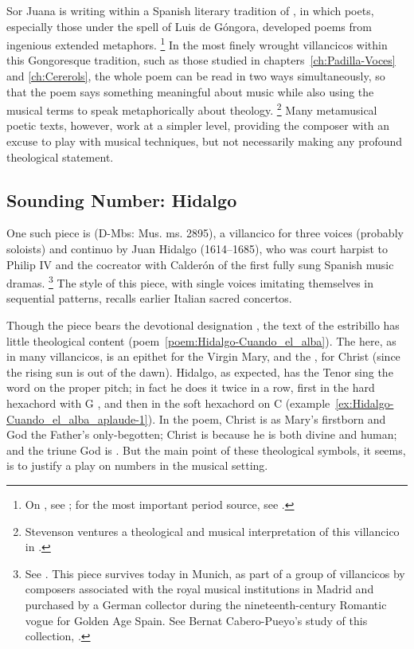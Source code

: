 Sor Juana is writing within a Spanish literary tradition of , in which poets, especially those under the spell of Luis de Góngora, developed poems from ingenious extended metaphors.%
	\footnote{%
	On , see \autocites{Tenorio:Gongorismo}[227--228]{Gaylord:Poetry}; for the most important period source, see \autocite{Gracian:Ingenio}. 
	}
In the most finely wrought villancicos within this Gongoresque tradition, such as those studied in chapters~\ref{ch:Padilla-Voces} and \ref{ch:Cererols}, the whole poem can be read in two ways simultaneously, so that the poem says something meaningful about music while also using the musical terms to speak metaphorically about theology.%
	\footnote{%
	Stevenson ventures a theological and musical interpretation of this villancico in .
	}
Many metamusical poetic texts, however, work at a simpler level, providing the composer with an excuse to play with musical techniques, but not necessarily making any profound theological statement.

\subsection{Sounding Number: Hidalgo}

One such piece is  (D-Mbs: Mus. ms. 2895), a villancico for three voices (probably soloists) and continuo by Juan Hidalgo (1614--1685), who was court harpist to Philip IV and the cocreator with Calderón of the first fully sung Spanish music dramas.%
	\footnote{%
See \autocite{Stein:Songs}.
This piece survives today in Munich, as part of a group of villancicos by composers associated with the royal musical institutions in Madrid and purchased by a German collector during the nineteenth-century Romantic vogue for Golden Age Spain.
See Bernat Cabero-Pueyo's study of this collection, .
	}
The style of this piece, with single voices imitating themselves in sequential patterns, recalls earlier Italian sacred concertos.

Though the piece bears the devotional designation  , the text of the estribillo has little theological content (poem~\ref{poem:Hidalgo-Cuando_el_alba}).
The  here, as in many villancicos, is an epithet for the Virgin Mary, and the , for Christ (since the rising sun is  out of the dawn).
Hidalgo, as expected, has the Tenor sing the word  on the proper pitch; in fact he does it twice in a row, first in the hard hexachord with G , and then in the soft hexachord on C  (example~\ref{ex:Hidalgo-Cuando_el_alba_aplaude-1}).
In the poem, Christ is  as Mary's firstborn and God the Father's only-begotten; Christ is  because he is both divine and human; and the triune God is .
But the main point of these theological symbols, it seems, is to justify a play on numbers in the musical setting.

